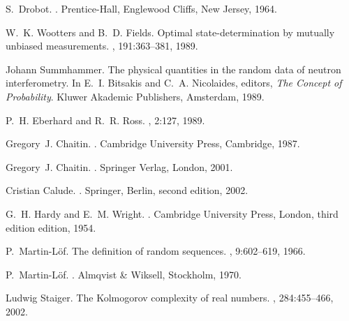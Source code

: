 \documentclass[12pt]{iopart}
\begin{document}
\begin{thebibliography}{10}

S.~Drobot.
.
\newblock Prentice-Hall, Englewood Cliffs, New Jersey, 1964.

W.~K. Wootters and B.~D. Fields.
\newblock Optimal state-determination by mutually unbiased measurements.
, 191:363--381, 1989.

Johann Summhammer.
\newblock The physical quantities in the random data of neutron interferometry.
\newblock In E.~I. Bitsakis and C.~A. Nicolaides, editors, {\em The Concept of
  Probability}. Kluwer Akademic Publishers, Amsterdam, 1989.

P.~H. Eberhard and R.~R. Ross.
, 2:127, 1989.

Gregory~J. Chaitin.
.
\newblock Cambridge University Press, Cambridge, 1987.

Gregory~J. Chaitin.
.
\newblock Springer Verlag, London, 2001.

Cristian Calude.
.
\newblock Springer, Berlin, second edition, 2002.

G.~H. Hardy and E.~M. Wright.
.
\newblock Cambridge University Press, London, third edition edition, 1954.

P.~Martin-L{\"{o}}f.
\newblock The definition of random sequences.
, 9:602--619, 1966.

P.~Martin-L{\"{o}}f.
.
\newblock Almqvist \& Wiksell, Stockholm, 1970.

Ludwig Staiger.
\newblock The {K}olmogorov complexity of real numbers.
, 284:455--466, 2002.

\end{thebibliography}
\end{document}
